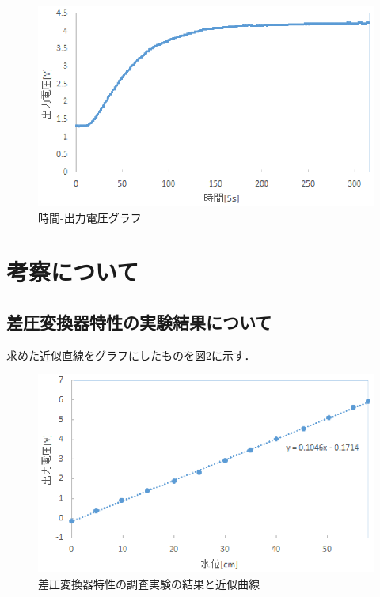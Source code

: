 \documentclass[11pt,a4paper]{jsarticle}
\begin{document}
\begin{figure}[h]
 \begin{center}
  \includegraphics[scale=1]{./picture/e6_4.eps}
  \caption{時間-出力電圧グラフ}
  \label{fig10}
 \end{center}
\end{figure}

\newpage
\pagestyle{fancy}
\renewcommand{\headrulewidth}{0.0pt}
\cfoot{}

 \section{考察について}
  \subsection{差圧変換器特性の実験結果について}
  求めた近似直線をグラフにしたものを図\ref{fig11}に示す．
  \begin{figure}[h]
   \begin{center}
    \includegraphics[scale=1]{./picture/e6_2.eps}
    \caption{差圧変換器特性の調査実験の結果と近似曲線}
    \label{fig11}
   \end{center}
  \end{figure}
\end{document}
